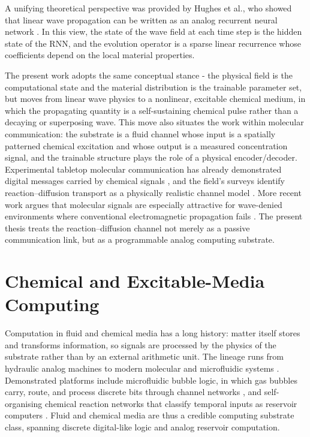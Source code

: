 A unifying theoretical perspective was provided by Hughes et al., who showed that linear wave propagation can be written as an analog recurrent neural network \cite{hughes2019wave}. In this view, the state of the wave field at each time step is the hidden state of the RNN, and the evolution operator is a sparse linear recurrence whose coefficients depend on the local material properties.

The present work adopts the same conceptual stance - the physical field is the computational state and the material distribution is the trainable parameter set, but moves from linear wave physics to a nonlinear, excitable chemical medium, in which the propagating quantity is a self-sustaining chemical pulse rather than a decaying or superposing wave.
This move also situates the work within molecular communication: the substrate is a fluid channel whose input is a spatially patterned chemical excitation and whose output is a measured concentration signal, and the trainable structure plays the role of a physical encoder/decoder.
Experimental tabletop molecular communication has already demonstrated digital messages carried by chemical signals \cite{farsad2013tabletop}, and the field's surveys identify reaction--diffusion transport as a physically realistic channel model \cite{farsad2016comprehensive}.
More recent work argues that molecular signals are especially attractive for wave-denied environments where conventional electromagnetic propagation fails \cite{guo2021molecular}.
The present thesis treats the reaction--diffusion channel not merely as a passive communication link, but as a programmable analog computing substrate.


\section{Chemical and Excitable-Media Computing}
\label{sec:lit_chemical}

Computation in fluid and chemical media has a long history: matter itself stores and transforms information, so signals are processed by the physics of the substrate rather than by an external arithmetic unit.
The lineage runs from hydraulic analog machines to modern molecular and microfluidic systems \cite{adamatzky2019liquid}. Demonstrated platforms include microfluidic bubble logic, in which gas bubbles carry, route, and process discrete bits through channel networks \cite{prakash2007bubble}, and self-organising chemical reaction networks that classify temporal inputs as reservoir computers \cite{baltussen2024chemical}.
Fluid and chemical media are thus a credible computing substrate class, spanning discrete digital-like logic and analog reservoir computation.

